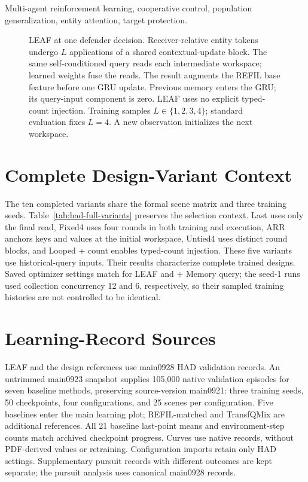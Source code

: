 \documentclass[journal,10pt]{IEEEtran}
\begin{document}
\par
\begin{IEEEkeywords}
Multi-agent reinforcement learning, cooperative control, population generalization, entity attention, target protection.
\end{IEEEkeywords}



\begin{figure}[!t]
\centering

\caption{LEAF at one defender decision. Receiver-relative entity tokens undergo $L$ applications of a shared contextual-update block. The same self-conditioned query reads each intermediate workspace; learned weights fuse the reads. The result augments the REFIL base feature before one GRU update. Previous memory enters the GRU; its query-input component is zero. LEAF uses no explicit typed-count injection. Training samples $L\in\{1,2,3,4\}$; standard evaluation fixes $L=4$. A new observation initializes the next workspace.}
\label{fig:framework}
\end{figure}



\appendices
\section{Complete Design-Variant Context}
The ten completed variants share the formal scene matrix and three training seeds. Table~\ref{tab:had-full-variants} preserves the selection context. Last uses only the final read, Fixed4 uses four rounds in both training and execution, ARR anchors keys and values at the initial workspace, Untied4 uses distinct round blocks, and Looped + count enables typed-count injection. These five variants use historical-query inputs. Their results characterize complete trained designs. Saved optimizer settings match for LEAF and + Memory query; the seed-1 runs used collection concurrency 12 and 6, respectively, so their sampled training histories are not controlled to be identical.
\HadFullVariantTable
\section{Learning-Record Sources}
\label{app:learning-source}
LEAF and the design references use main0928 HAD validation records. An untrimmed main0923 snapshot supplies 105,000 native validation episodes for seven baseline methods, preserving source-version main0921: three training seeds, 50 checkpoints, four configurations, and 25 scenes per configuration. Five baselines enter the main learning plot; REFIL-matched and TransfQMix are additional references. All 21 baseline last-point means and environment-step counts match archived checkpoint progress. Curves use native records, without PDF-derived values or retraining. Configuration imports retain only HAD settings. Supplementary pursuit records with different outcomes are kept separate; the pursuit analysis uses canonical main0928 records.
\end{document}
